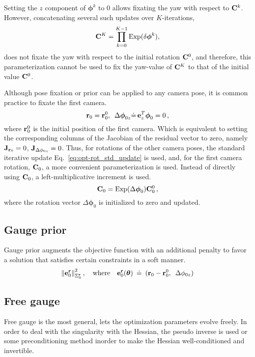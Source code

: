 Setting the $z$ component of $\boldsymbol{\phi}^{k}$ to 0 allows fixating the
yaw with respect to ${{\mathbf{C}}}^{k}$. However, concatenating several such updates
over $K$-iterations,
%
\begin{equation}
  {{\mathbf{C}}}^{K} = \prod^{K-1}_{k=0} \text{Exp}(\delta \boldsymbol{\phi}^{k}) ,
\end{equation}
%
does not fixate the yaw with respect to the initial rotation ${{\mathbf{C}}}^{0}$, and
therefore, this parameterization cannot be used to fix the yaw-value of
${{\mathbf{C}}}^{K}$ to that of the initial value ${{\mathbf{C}}}^{0}$.

Although pose fixation or prior can be applied to any camera pose, it is common
practice to fixate the first camera.
%
\begin{equation}
  {{\mathbf{r}}}_{0} = {{\mathbf{r}}}^{0}_{0} ,
  \enspace
  \Delta \boldsymbol{\phi}_{0 z}
    \dot{=} \, {\mathbf{e}}^{T}_{z} \boldsymbol{\phi}_{0} = 0 \, ,
\end{equation}
%
where ${{\mathbf{r}}}^{0}_{0}$ is the initial position of the first camera. Which is
equivalent to setting the corresponding columns of the Jacobian of the residual
vector to zero, namely ${{\mathbf{J}}}_{{{\mathbf{r}}}_0} = 0$, ${{\mathbf{J}}}_{\Delta \phi_{0 z}} = 0$.
Thus, for rotations of the other camera poses, the standard iterative update
Eq.~\eqref{eq:opt-rot_std_update} is used, and, for the first camera rotation,
${{\mathbf{C}}}_{0}$, a more convenient parameterization is used. Instead of directly
using ${{\mathbf{C}}}_{0}$, a left-multiplicative increment is used.
%
\begin{equation}
  {{\mathbf{C}}}_{0} = \text{Exp}(\Delta \boldsymbol{\phi}_{0}) {{\mathbf{C}}}^{0}_{0} \, ,
\end{equation}
%
where the rotation vector $\Delta \boldsymbol{\phi}_{0}$ is initialized to zero
and updated.


\subsection{Gauge prior}

Gauge prior augments the objective function with an additional penalty to favor
a solution that satisfies certain constraints in a soft manner.
%
\begin{equation}
  {\|{\mathbf{e}}^{{{\mathbf{r}}}}_{0}\|}^{2}_{\Sigma^{{{\mathbf{r}}}}_{0}} \, ,
  \quad \text{where} \quad
  {\mathbf{e}}^{{{\mathbf{r}}}}_{0}(\boldsymbol{\theta})
    \enspace \dot{=} \enspace
    ({{\mathbf{r}}}_{0} - {{\mathbf{r}}}^{0}_{0}, \enspace \Delta \phi_{0 z})
\end{equation}



\subsection{Free gauge}

Free gauge is the most general, lets the optimization parameters evolve freely.
In order to deal with the singularity with the Hessian, the pseudo inverse is
used or some preconditioning method inorder to make the Hessian
well-conditioned and invertible.
